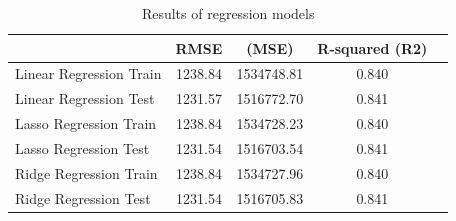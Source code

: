 \documentclass{article}
\begin{document}
\begin{table}[h]
    \centering
    \begin{tabular}{|l|c|c|c|p{5cm}|} 
        \hline
        \textbf{ } & \textbf{RMSE} & \textbf{(MSE)} & \textbf{R-squared (R2)} \\
        \hline
        Linear Regression Train & 1238.84 & 1534748.81 & 0.840 \\
         \hline
         Linear Regression Test & 1231.57 & 1516772.70 & 0.841 \\
        \hline
        Lasso Regression Train & 1238.84 & 1534728.23 & 0.840 \\
         \hline
        Lasso Regression Test & 1231.54 & 1516703.54 & 0.841 \\
         \hline
        Ridge Regression Train & 1238.84 & 1534727.96 & 0.840 \\
        \hline
        Ridge Regression Test & 1231.54 & 1516705.83 & 0.841 \\
        \hline
  
    \end{tabular}
    
    \caption{Results of regression models}
    \label{tab:regression_results}
\end{table}
\end{document}
